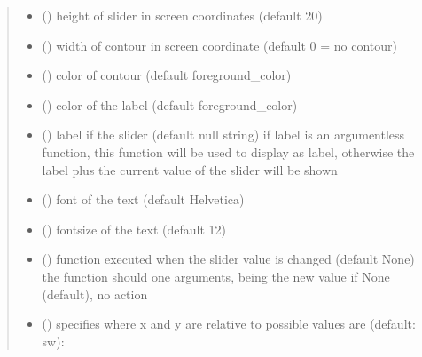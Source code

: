\documentclass[letterpaper,10pt,english]{sphinxmanual}
\begin{document}
\begin{fulllineitems}
\begin{quote}
\begin{description}
\begin{itemize}
\item {} 
 () \textendash{} height of slider in screen coordinates (default 20)

\item {} 
 () \textendash{} width of contour in screen coordinate (default 0 = no contour)

\item {} 
 () \textendash{} color of contour (default foreground\_color)

\item {} 
 () \textendash{} color of the label (default foreground\_color)

\item {} 
 () \textendash{} label if the slider (default null string) 
if label is an argumentless function, this function
will be used to display as label, otherwise the
label plus the current value of the slider will be shown

\item {} 
 () \textendash{} font of the text (default Helvetica)

\item {} 
 () \textendash{} fontsize of the text (default 12)

\item {} 
 () \textendash{} function executed when the slider value is changed (default None) 
the function should one arguments, being the new value 
if None (default), no action

\item {} 
 () \textendash{} specifies where x and y are relative to 
possible values are (default: sw): 


\end{itemize}
\end{description}
\end{quote}
\end{fulllineitems}
\end{document}
